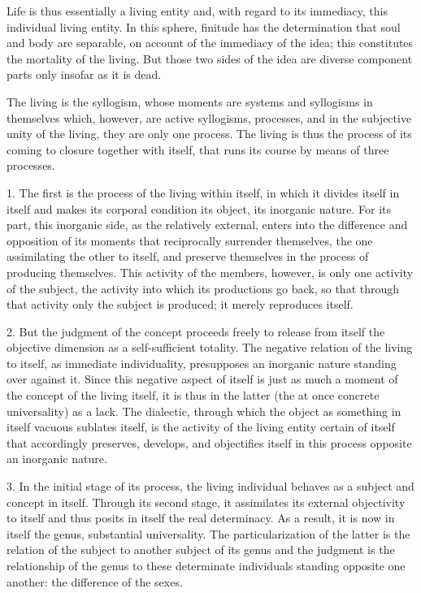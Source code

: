 Life is thus essentially a living entity and, with regard to its immediacy,
this individual living entity.
In this sphere, finitude has the determination that soul and body are separable,
on account of the immediacy of the idea;
this constitutes the mortality of the living.
But those two sides of the idea are diverse component parts
only insofar as it is dead.

The living is the syllogism, whose moments are systems and syllogisms
in themselves which, however, are active syllogisms, processes, and
in the subjective unity of the living, they are only one process.
The living is thus the process of its coming to closure together with itself,
that runs its course by means of three processes.

1. The first is the process of the living within itself,
in which it divides itself in itself and makes its
corporal condition its object, its inorganic nature.
For its part, this inorganic side, as the relatively external,
enters into the difference and opposition of its moments that reciprocally
surrender themselves, the one assimilating the other to itself, and
preserve themselves in the process of producing themselves.
This activity of the members, however, is only one activity of
the subject, the activity into which its productions go back,
so that through that activity only the subject is produced;
it merely reproduces itself.

2. But the judgment of the concept proceeds freely to release from itself
the objective dimension as a self-sufficient totality.
The negative relation of the living to itself, as immediate individuality,
presupposes an inorganic nature standing over against it.
Since this negative aspect of itself is just as much a moment of
the concept of the living itself, it is thus in the latter
(the at once concrete universality) as a lack.
The dialectic, through which the object as something in itself vacuous sublates itself,
is the activity of the living entity certain of itself that accordingly
preserves, develops, and objectifies itself in this process opposite an inorganic nature.

3. In the initial stage of its process, the living individual
behaves as a subject and concept in itself.
Through its second stage, it assimilates its external objectivity to itself and
thus posits in itself the real determinacy.
As a result, it is now in itself the genus, substantial universality.
The particularization of the latter is the relation of
the subject to another subject of its genus and
the judgment is the relationship of the genus to these
determinate individuals standing opposite one another:
the difference of the sexes.


